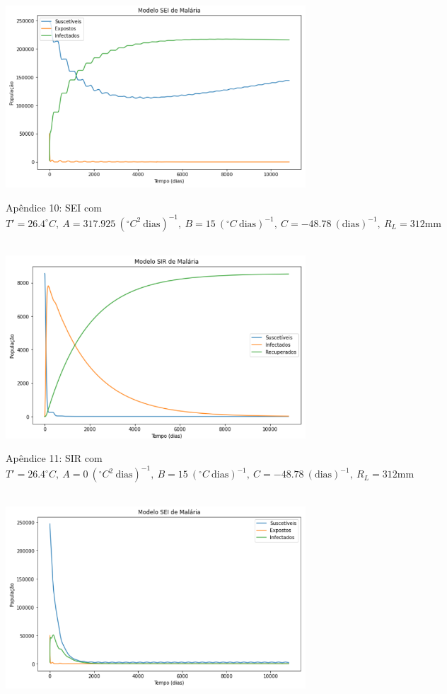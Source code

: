 \documentclass[
	12pt,				%
	oneside,			%
	a4paper,			%
	english,			%
	brazil				%
	]{abntex2}
\begin{document}
\begin{apendicesenv}
\begin{figure}[!ht]
	\hbox{\hspace{3.5em} \includegraphics[scale=0.6] {SEI_Correcao_max_A317.png}}
	\caption*{Apêndice 10: SEI com $T'=26.4^\circ C, \ A=317.925 \ (^\circ C^2 \ \text{dias})^{-1}, \ B=15 \ (^\circ C \ \text{dias})^{-1}, \ C=-48.78 \ (\text{dias})^{-1}, \ R_L=312 \text{mm}$}
\end{figure}
\newpage
\begin{figure}[!ht]
	\centering
	\hbox{\hspace{3.8em} \includegraphics[scale=0.6] {SIR_Correcao_max_A0.png}}
	\caption*{Apêndice 11: SIR com $T'=26.4^\circ C, \ A=0 \ (^\circ C^2 \ \text{dias})^{-1}, \ B=15 \ (^\circ C \ \text{dias})^{-1}, \ C=-48.78 \ (\text{dias})^{-1}, \ R_L=312 \text{mm}$}
\end{figure} 
\begin{figure}[!ht]
	\centering
	\hbox{\hspace{3.5em} \includegraphics[scale=0.6] {SEI_Correcao_max_A0.png}}

\end{figure}
\end{apendicesenv}
\end{document}
